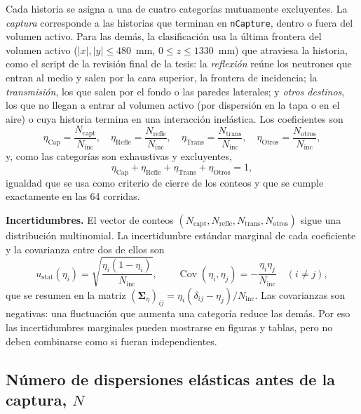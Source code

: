 \documentclass[11pt,a4paper]{article}
\newcommand{\archivo}[1]{\path{#1}}
\newcommand{\var}[1]{\texttt{#1}}
\begin{document}
Cada historia se asigna a una de cuatro categorías mutuamente excluyentes. La \emph{captura} corresponde a las historias que terminan en \var{nCapture}, dentro o fuera del volumen activo. Para las demás, la clasificación usa la última frontera del volumen activo ($|x|,|y|\le480$~mm, $0\le z\le1330$~mm) que atraviesa la historia, como el script \archivo{balance_caras_tanque.py} de la revisión final de la tesis: la \emph{reflexión} reúne los neutrones que entran al medio y salen por la cara superior, la frontera de incidencia; la \emph{transmisión}, los que salen por el fondo o las paredes laterales; y \emph{otros destinos}, los que no llegan a entrar al volumen activo (por dispersión en la tapa o en el aire) o cuya historia termina en una interacción inelástica. Los coeficientes son
\begin{equation}
\eta_\mathrm{Cap}=\frac{N_\mathrm{capt}}{N_\mathrm{inc}},\quad
\eta_\mathrm{Refle}=\frac{N_\mathrm{refle}}{N_\mathrm{inc}},\quad
\eta_\mathrm{Trans}=\frac{N_\mathrm{trans}}{N_\mathrm{inc}},\quad
\eta_\mathrm{Otros}=\frac{N_\mathrm{otros}}{N_\mathrm{inc}},
\label{eq:coeficientes}
\end{equation}
y, como las categorías son exhaustivas y excluyentes,
\begin{equation}
\eta_\mathrm{Cap}+\eta_\mathrm{Refle}+\eta_\mathrm{Trans}+\eta_\mathrm{Otros}=1 ,
\label{eq:balance}
\end{equation}
igualdad que se usa como criterio de cierre de los conteos y que se cumple exactamente en las 64 corridas.

\textbf{Incertidumbres.} El vector de conteos $(N_\mathrm{capt},N_\mathrm{refle},N_\mathrm{trans},N_\mathrm{otros})$ sigue una distribución multinomial. La incertidumbre estándar marginal de cada coeficiente y la covarianza entre dos de ellos son
\begin{equation}
u_\mathrm{stat}(\eta_i)=\sqrt{\frac{\eta_i(1-\eta_i)}{N_\mathrm{inc}}},\qquad
\operatorname{Cov}(\eta_i,\eta_j)=-\frac{\eta_i\eta_j}{N_\mathrm{inc}}\quad(i\neq j),
\label{eq:incertidumbre}
\end{equation}
que se resumen en la matriz $(\boldsymbol{\Sigma}_\eta)_{ij}=\eta_i(\delta_{ij}-\eta_j)/N_\mathrm{inc}$. Las covarianzas son negativas: una fluctuación que aumenta una categoría reduce las demás. Por eso las incertidumbres marginales pueden mostrarse en figuras y tablas, pero no deben combinarse como si fueran independientes.

\subsection{Número de dispersiones elásticas antes de la captura, $N$}
\label{sec:N}
\end{document}
